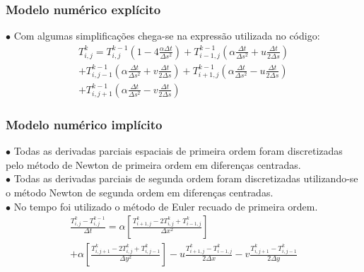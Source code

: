 \documentclass[xcolor=dvipsnames,10pt,aspectratio=169]{beamer}
\begin{document}
	\begin{frame} 
	\frametitle{Modelo numérico explícito}
	$\bullet$ Com algumas simplificações chega-se na expressão utilizada no código:
	\begin{equation}
	\begin{split}
	T_{i,j}^{k} = T_{i,j}^{k-1} \left( 1 - 4 \frac{\alpha \Delta t}{\Delta s ^2}\right) + T_{i -1, j}^{k-1} \left( \alpha \frac{\Delta t}{\Delta s^2} + u \frac{\Delta t}{2 \Delta s} \right)\\
	+ T_{i,j-1}^{k-1} \left( \alpha \frac{\Delta t}{\Delta s^2} + v \frac{\Delta t}{2 \Delta s} \right) +  T_{i+1,j}^{k-1} \left( \alpha \frac{\Delta t}{ \Delta s^2} - u \frac{\Delta t}{2 \Delta s}\right) \\
	+  T_{i,j+1}^{k-1} \left( \alpha \frac{\Delta t}{\Delta s^2} - v \frac{\Delta t}{2 \Delta s}\right)
	\end{split}
	\end{equation}

	\end{frame}





	\begin{frame} 
	\frametitle{Modelo numérico implícito}
	$\bullet$ Todas as derivadas parciais espaciais de primeira ordem foram discretizadas pelo método de Newton de primeira ordem em diferenças centradas.\\
	$\bullet$ Todas as derivadas parciais de segunda ordem foram discretizadas utilizando-se o método Newton de segunda ordem em diferenças centradas.\\
	$\bullet$ No tempo foi utilizado o método de Euler recuado de primeira ordem.\\
	
	
	\begin{equation}
	\begin{split}
	\frac{T_{i,j}^{k} - T_{i , j}^{k-1} }{\Delta t}
	= \alpha \left[  \frac{T_{i+1,j}^{k} - 2 T_{i,j}^{k} + T_{i-1,j}^{k} }{\Delta x^2} \right]\\
	 +\alpha \left[\frac{T_{i,j+1}^{k} - 2 T_{i,j}^{k} + T_{i,j-1}^{k}}{\Delta y^2}\right] - u \frac{T_{i+1,j}^{k} - T_{i-1,j}^{k}}{2 \Delta x} - v \frac{T_{i,j+1}^{k} - T_{i , j-1}^{k}}{2 \Delta y}  
	\end{split}
	\end{equation}
	
	\end{frame}
\end{document}
